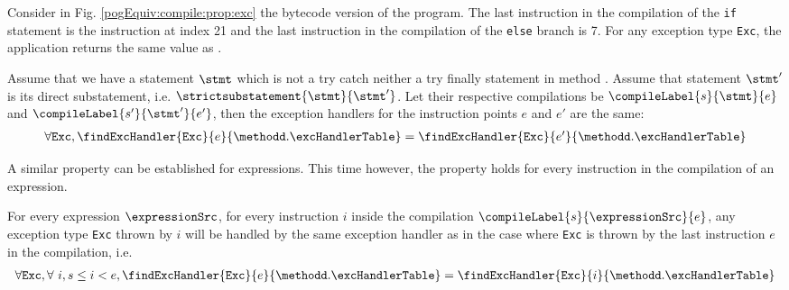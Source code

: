 Consider in Fig. \ref{pogEquiv:compile:prop:exc} the bytecode version of the program. The last  instruction in the compilation of the \lstinline!if! statement is the 
instruction at index 21 and the last instruction in the compilation of the \lstinline!else! branch is 7. 
For any exception type \mbox{\rm\tt{Exc}}, the application  returns the same value  as
. 

\begin{compProp}\label{compile:prop:compProp8}
 Assume that we have a statement  $\stmt$  which is not a try catch  neither a try finally statement in method \methodd. Assume that 
  statement $\stmt'$ is its direct substatement, i.e. 
$\strictsubstatement{\stmt}{\stmt'} $. Let 
 their respective compilations be  $\compileLabel{s}{\stmt}{e}$ and  $\compileLabel{s'}{\stmt'}{e'}$, then the exception handlers for the instruction points $e$ and $e'$ are the same:
$$ \begin{array}{l}
          \forall \mbox{\rm\tt{Exc}}, \findExcHandler{\mbox{\rm\tt{Exc}} }{e}{\methodd.\excHandlerTable} = 
	 \findExcHandler{\mbox{\rm\tt{Exc}} }{e'}{\methodd.\excHandlerTable} 
   \end{array}
$$


\end{compProp}

A similar property can be established for expressions. This time however, the property holds for
every instruction in the compilation of an expression.
 
\begin{compProp}\label{compile:prop:compProp9}
  For every expression $\expressionSrc$,
  for every instruction $i$ inside the compilation  $\compileLabel{s}{\expressionSrc}{e}$,
  any exception type \mbox{\rm\tt{Exc}} thrown by  $i$  will be handled by the same exception handler 
  as in the case where \mbox{\rm\tt{Exc}}   is thrown by the last instruction $e$ in the compilation, i.e.
$$ \begin{array}{l}
          \forall \mbox{\rm\tt{Exc}}, \forall  \ i, s \le i < e , 
	   \findExcHandler{\mbox{\rm\tt{Exc}} }{e}{\methodd.\excHandlerTable} = 
	  \findExcHandler{\mbox{\rm\tt{Exc}} }{i}{\methodd.\excHandlerTable} 
   \end{array}
$$
\end{compProp}


